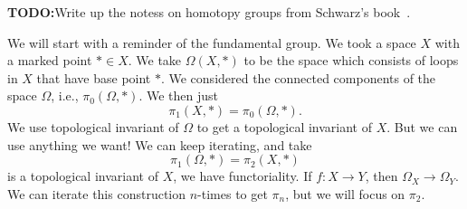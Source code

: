 
{\textbf{TODO:}\quad{}Write up the notess on homotopy
groups from Schwarz's book~\cite[Ch.\ 8]{schwarz}.}

We will start with a reminder of the fundamental group. We took a
space $X$ with a marked point $*\in X$. We take $\Omega(X,*)$ to
be the space which consists of loops in $X$ that have base point
$*$. We considered the connected components of the space
$\Omega$, i.e., $\pi_{0}(\Omega,*)$. We then just
\begin{equation}
\pi_{1}(X,*)=\pi_{0}(\Omega,*).
\end{equation}
We use topological invariant of $\Omega$ to get a topological
invariant of $X$. But we can use anything we want! We can keep
iterating, and take
\begin{equation}
\pi_{1}(\Omega,*)=\pi_{2}(X,*)
\end{equation}
is a topological invariant of $X$, we have functoriality. If
$f\colon X\to Y$, then $\Omega_{X}\to\Omega_{Y}$.
We can iterate this construction $n$-times to get $\pi_{n}$, but
we will focus on $\pi_{2}$.


